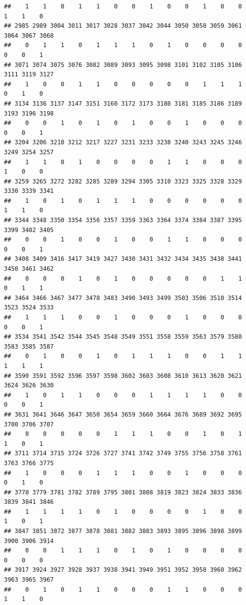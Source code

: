 \documentclass[
]{article}
\begin{document}
\begin{verbatim}
##    1    1    0    1    1    0    0    1    0    0    1    0    0    1    1    0 
## 2985 2989 3004 3011 3017 3028 3037 3042 3044 3050 3058 3059 3061 3064 3067 3068 
##    0    1    1    0    1    1    1    0    1    0    0    0    0    0    0    1 
## 3071 3074 3075 3076 3082 3089 3093 3095 3098 3101 3102 3105 3106 3111 3119 3127 
##    1    0    0    1    1    0    0    0    0    0    1    1    1    0    1    0 
## 3134 3136 3137 3147 3151 3160 3172 3173 3180 3181 3185 3186 3189 3193 3196 3198 
##    0    0    1    0    1    0    1    0    0    1    0    0    0    0    0    1 
## 3204 3206 3210 3212 3217 3227 3231 3233 3238 3240 3243 3245 3246 3249 3254 3257 
##    1    1    0    1    0    0    0    0    1    1    0    0    0    1    0    0 
## 3259 3265 3272 3282 3285 3289 3294 3305 3310 3323 3325 3328 3329 3330 3339 3341 
##    1    0    1    0    1    1    1    0    0    0    0    0    0    1    1    0 
## 3344 3348 3350 3354 3356 3357 3359 3363 3364 3374 3384 3387 3395 3399 3402 3405 
##    0    0    1    0    0    1    0    0    1    1    0    0    0    0    0    1 
## 3408 3409 3416 3417 3419 3427 3430 3431 3432 3434 3435 3438 3441 3450 3461 3462 
##    0    0    0    1    0    1    0    0    0    0    0    1    1    0    1    1 
## 3464 3466 3467 3477 3478 3483 3490 3493 3499 3503 3506 3510 3514 3523 3524 3533 
##    1    1    1    0    0    1    0    0    0    1    0    0    0    0    0    1 
## 3534 3541 3542 3544 3545 3548 3549 3551 3558 3559 3563 3579 3580 3583 3585 3587 
##    0    1    0    0    1    0    1    1    1    0    0    1    1    1    1    1 
## 3590 3591 3592 3596 3597 3598 3602 3603 3608 3610 3613 3620 3621 3624 3626 3630 
##    1    0    1    1    0    0    0    1    1    1    1    0    0    0    0    1 
## 3631 3641 3646 3647 3650 3654 3659 3660 3664 3676 3689 3692 3695 3700 3706 3707 
##    0    0    0    0    0    1    1    1    0    0    1    0    1    1    0    1 
## 3711 3714 3715 3724 3726 3727 3741 3742 3749 3755 3756 3758 3761 3763 3766 3775 
##    1    0    0    0    1    1    1    0    0    1    0    0    0    0    1    0 
## 3778 3779 3781 3782 3789 3795 3801 3808 3819 3823 3824 3833 3836 3839 3841 3846 
##    1    1    1    1    0    1    0    0    0    0    1    0    0    1    0    1 
## 3847 3851 3872 3877 3878 3881 3882 3883 3893 3895 3896 3898 3899 3900 3906 3914 
##    0    0    1    1    1    0    1    0    1    0    0    0    0    0    0    0 
## 3917 3924 3927 3928 3937 3938 3941 3949 3951 3952 3958 3960 3962 3963 3965 3967 
##    0    1    0    1    1    0    0    0    1    1    0    0    0    1    1    0 

\end{verbatim}
\end{document}
